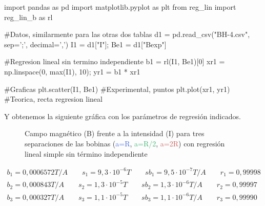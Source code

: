 \documentclass[12pt, a4paper, titlepage]{article}
\begin{document}
  \begin{python}
    import pandas as pd
    import matplotlib.pyplot as plt
    from reg_lin import reg_lin_b as rl

    #Datos, similarmente para las otras dos tablas
    d1 = pd.read_csv("BH-4.csv", sep=';', decimal=',')
    I1 = d1["I"]; Be1 = d1["Bexp"]

    #Regresion lineal sin termino independiente
    b1 = rl(I1, Be1)[0]
    xr1 = np.linspace(0, max(I1), 10); yr1 = b1 * xr1

    #Graficas
    plt.scatter(I1, Be1) #Experimental, puntos
    plt.plot(xr1, yr1) #Teorica, recta regresion lineal
  \end{python}

  Y obtenemos la siguiente gráfica con los parámetros de regresión indicados.

  \begin{figure}[H]
    \hspace{2.5em} 
    \caption{Campo magnético (B) frente a la intensidad (I) para tres separaciones de las bobinas (\textcolor{RoyalBlue}{a=R}, \textcolor{MediumSeaGreen}{a=R/2}, \textcolor{IndianRed}{a=2R}) con regresión lineal simple sin término independiente}
  \end{figure}
  \begin{gather*}
    b_1 = 0,0006572 T/A \qquad s_1 = 9,3 \cdot 10^{-6} T \qquad sb_1 = 9,5 \cdot 10^{-7} T/A \qquad r_1 = 0,99998 \\
    b_2 = 0,000843 T/A \qquad s_2 = 1,3 \cdot 10^{-5} T \qquad sb_2 = 1,3 \cdot 10^{-6} T/A \qquad r_2 = 0,99997 \\
    b_3 = 0,000327 T/A \qquad s_3 = 1,1 \cdot 10^{-5} T \qquad sb_3 = 1,1 \cdot 10^{-6} T/A \qquad r_3 = 0,99990
  \end{gather*}
\end{document}
